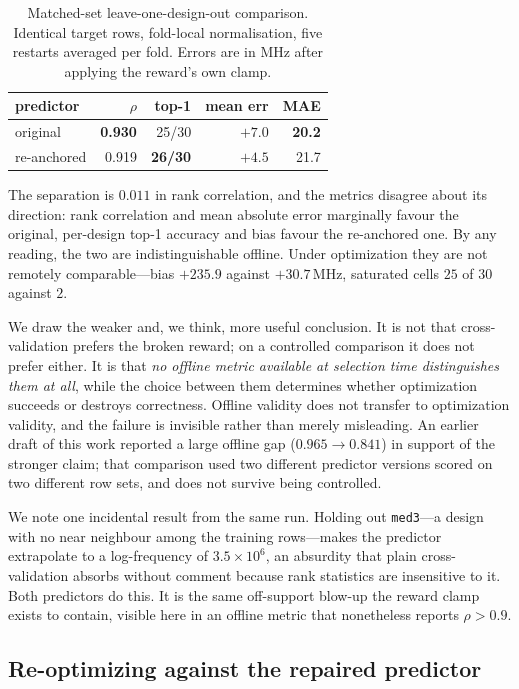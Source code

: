 \documentclass[journal]{IEEEtran}
\begin{document}
\begin{table}[t]
\caption{Matched-set leave-one-design-out comparison. Identical target rows,
fold-local normalisation, five restarts averaged per fold. Errors are in MHz
after applying the reward's own clamp.}
\label{tab:lodo}
\centering
\small
\begin{tabular}{lrrrr}
\toprule
predictor & $\rho$ & top-1 & mean err & MAE \\
\midrule
original    & \textbf{0.930} & 25/30 & $+7.0$ & \textbf{20.2} \\
re-anchored & 0.919 & \textbf{26/30} & $\mathbf{+4.5}$ & 21.7 \\
\bottomrule
\end{tabular}
\end{table}

The separation is $0.011$ in rank correlation, and the metrics disagree about
its direction: rank correlation and mean absolute error marginally favour the
original, per-design top-1 accuracy and bias favour the re-anchored one. By any
reading, the two are indistinguishable offline. Under optimization they are not
remotely comparable---bias $+235.9$ against $+30.7$\,MHz, saturated cells $25$
of $30$ against $2$.

We draw the weaker and, we think, more useful conclusion. It is not that
cross-validation prefers the broken reward; on a controlled comparison it does
not prefer either. It is that \emph{no offline metric available at selection
time distinguishes them at all}, while the choice between them determines
whether optimization succeeds or destroys correctness. Offline validity does not
transfer to optimization validity, and the failure is invisible rather than
merely misleading. An earlier draft of this work reported a large offline gap
($0.965 \rightarrow 0.841$) in support of the stronger claim; that comparison
used two different predictor versions scored on two different row sets, and does
not survive being controlled.

We note one incidental result from the same run. Holding out \texttt{med3}---a
design with no near neighbour among the training rows---makes the predictor
extrapolate to a log-frequency of $3.5 \times 10^6$, an absurdity that plain
cross-validation absorbs without comment because rank statistics are insensitive
to it. Both predictors do this. It is the same off-support blow-up the reward
clamp exists to contain, visible here in an offline metric that nonetheless
reports $\rho > 0.9$.

\subsection{Re-optimizing against the repaired predictor}
\end{document}
